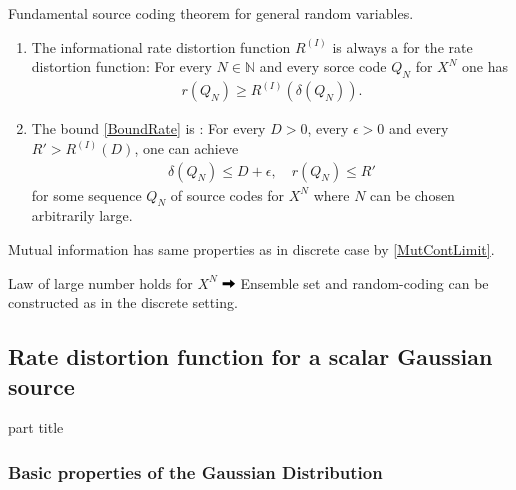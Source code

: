 \begin{frame}{Fundamental source coding theorem for general random variables.}
\begin{theorem} 
\begin{enumerate}
\item The informational rate distortion function $R^{(I)}$ is always a  for the rate distortion function: 
For every $N\in\mathbb{N}$ and every sorce code $Q_N$ for $X^N$ one has  
\begin{align}\label{BoundRate}
r(Q_N)\geq R^{(I)}(\delta(Q_N)). 
\end{align}
\item The bound \eqref{BoundRate} is : For every $D>0$, every $\epsilon>0$ and every $R'>R^{(I)}(D)$, one can achieve 
\begin{align*}
\delta(Q_N)\leq D+\epsilon, \quad r(Q_N)\leq R'
\end{align*}
for some sequence $Q_N$  of source codes for $X^N$ where $N$ can be chosen arbitrarily large.    
\end{enumerate} 
\end{theorem}
\bit
\item Mutual information has same properties as in discrete case by \eqref{MutContLimit}.
\item Law of large number holds for $X^N$ $\iarrow$ Ensemble set and random-coding can be constructed as in the discrete setting. 
\eit 
\end{frame}


\subsection{Rate distortion function for a scalar Gaussian source}

\begin{frame}
 \vspace{12.0ex}
\begin{center}
\begin{beamercolorbox}[sep=12pt,center]{part title}
\insertsubsection\par
\end{beamercolorbox}
\end{center}
\end{frame}



\subsubsection{Basic properties of the Gaussian Distribution}

